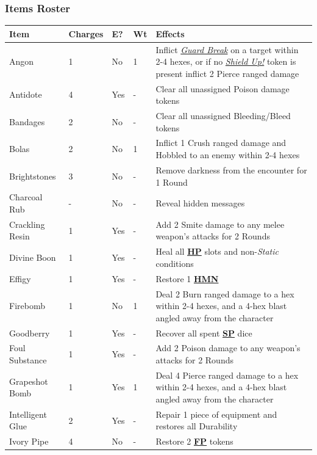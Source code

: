 \documentclass[12pt]{article}
\newcommand{\refto}[1]{\hyperlink{#1}{\textbf{#1}}}
\newcommand{\reftoit}[1]{\hyperlink{#1}{\emph{#1}}}
\begin{document}
\subsubsection*{Items Roster}
\begin{center}
\begin{tabularx}{\textwidth}{p{}p{}p{}p{}p{}}
\hline
\rowcolor{white} \textbf{Item} & \textbf{Charges} & \textbf{E?} & \textbf{Wt} & \textbf{Effects}\setcounter{rownum}{0}\\
\hline
Angon & 1 & No & 1 & Inflict \reftoit{Guard Break} on a target within 2-4 hexes, or if no \reftoit{Shield Up!} token is present inflict 2 Pierce ranged damage\\
Antidote & 4 & Yes & - & Clear all unassigned Poison damage tokens \\
Bandages & 2 & No & - & Clear all unassigned Bleeding/Bleed tokens \\
Bolas & 2 & No & 1 & Inflict 1 Crush ranged damage and Hobbled to an enemy within 2-4 hexes\\
Brightstones & 3 & No & - & Remove darkness from the encounter for 1 Round\\
Charcoal Rub & - & No & - & Reveal hidden messages\\
Crackling Resin & 1 & Yes & - & Add 2 Smite damage to any melee weapon’s attacks for 2 Rounds \\
Divine Boon & 1 & Yes & - & Heal all \refto{HP} slots and non-\emph{Static} conditions\\
Effigy & 1 & Yes & - & Restore 1 \refto{HMN}\\
Firebomb & 1 & No & 1 & Deal 2 Burn ranged damage to a hex within 2-4 hexes, and a 4-hex blast angled away from the character \\
Goodberry & 1 & Yes & - & Recover all spent \refto{SP} dice \\
Foul Substance & 1 & Yes & - & Add 2 Poison damage to any weapon’s attacks for 2 Rounds \\
Grapeshot Bomb & 1 & Yes & 1 & Deal 4 Pierce ranged damage to a hex within 2-4 hexes, and a 4-hex blast angled away from the character \\
Intelligent Glue & 2 & Yes & - & Repair 1 piece of equipment and restores all Durability\\
Ivory Pipe & 4 & No & - & Restore 2 \refto{FP} tokens \\
\hline
\end{tabularx}
\end{center}
\end{document}
